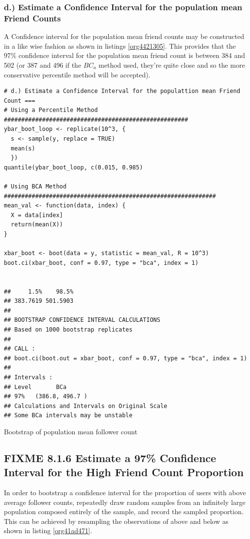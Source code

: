 \documentclass[11pt]{article}
\begin{document}
\subsubsection{d.) Estimate a Confidence Interval for the population mean Friend Counts}
\label{sec:orgbf8bece}
A Confidence interval for the population mean friend counts may be constructed in a like wise fashion as shown in listings \ref{org4421305}. This provides that the 97\% confidence interval for the population mean friend count is between 384 and 502 (or 387 and 496 if the \(BC_{a}\) method used, they're quite close and so the more conservative percentile method will be accepted).

\begin{listing}[htbp]
\begin{verbatim}
# d.) Estimate a Confidence Interval for the populattion mean Friend Count ===
# Using a Percentile Method #####################################################
ybar_boot_loop <- replicate(10^3, {
  s <- sample(y, replace = TRUE)
  mean(s)
  })
quantile(ybar_boot_loop, c(0.015, 0.985)

# Using BCA Method #############################################################
mean_val <- function(data, index) {
  X = data[index]
  return(mean(X))
}

xbar_boot <- boot(data = y, statistic = mean_val, R = 10^3)
boot.ci(xbar_boot, conf = 0.97, type = "bca", index = 1)


##     1.5%    98.5%
## 383.7619 501.5903
##
## BOOTSTRAP CONFIDENCE INTERVAL CALCULATIONS
## Based on 1000 bootstrap replicates
##
## CALL :
## boot.ci(boot.out = xbar_boot, conf = 0.97, type = "bca", index = 1)
##
## Intervals :
## Level       BCa
## 97%   (386.8, 496.7 )
## Calculations and Intervals on Original Scale
## Some BCa intervals may be unstable
\end{verbatim}
\caption{\label{org4421305}Bootstrap of population mean follower count}
\end{listing}

\subsection{{\bfseries\sffamily FIXME} 8.1.6 Estimate a 97\% Confidence Interval for the High Friend Count Proportion}
\label{sec:org67efab0}
In order to bootstrap a confidence interval for the proportion of users with
above average follower counts, repeatedly draw random samples from an infinitely
large population composed entirely of the sample, and record the sampled
proportion. This can be achieved by resampling the observations of above and
below as shown in listing \ref{org41ad471}.
\end{document}

